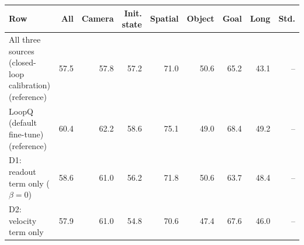 \begin{tabular}{lrrrrrrrr}
\toprule
Row & All & Camera & Init. state & Spatial & Object & Goal & Long & Std. \\
\midrule
All three sources (closed-loop calibration) (reference) & 57.5 & 57.8 & 57.2 & 71.0 & 50.6 & 65.2 & 43.1 & -- \\
LoopQ (default fine-tune) (reference) & 60.4 & 62.2 & 58.6 & 75.1 & 49.0 & 68.4 & 49.2 & -- \\
D1: readout term only ($\beta = 0$) & 58.6 & 61.0 & 56.2 & 71.8 & 50.6 & 63.7 & 48.4 & -- \\
D2: velocity term only & 57.9 & 61.0 & 54.8 & 70.6 & 47.4 & 67.6 & 46.0 & -- \\
\bottomrule
\end{tabular}
